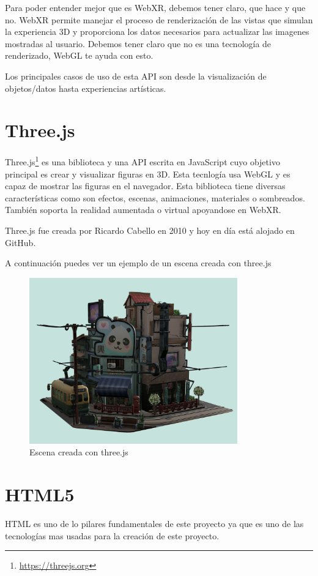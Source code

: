 \documentclass[a4paper, 12pt]{book}
\begin{document}
Para poder entender mejor que es WebXR, debemos tener claro, que hace y que no. WebXR permite manejar el proceso de renderización de las vistas que simulan la experiencia 3D y proporciona los datos necesarios para actualizar las imagenes mostradas al usuario. Debemos tener claro que no es una tecnología de renderizado, WebGL te ayuda con esto.

Los principales casos de uso de esta API son desde la visualización de objetos/datos hasta experiencias artísticas. 

\section{Three.js} %
\label{sec:Three}
Three.js\footnote{\url{https://threejs.org}} es una biblioteca y una API escrita en JavaScript cuyo objetivo principal es crear y visualizar figuras en 3D. Esta tecnlogía usa WebGL y es capaz de mostrar las figuras en el navegador. Esta biblioteca tiene diversas características como son efectos, escenas, animaciones, materiales o sombreados. También soporta la realidad aumentada o virtual apoyandose en WebXR.

Three.js fue creada por Ricardo Cabello en 2010 y hoy en día está alojado en GitHub.

A continuación puedes ver un ejemplo de un escena creada con three.js
\begin{figure}
  \centering
  \includegraphics[width=9cm, keepaspectratio]{img/threejs.png}
  \caption{Escena creada con three.js}\label{fig:three}
\end{figure}


\section{HTML5} %
\label{sec:HTML5}
HTML es uno de lo pilares fundamentales de este proyecto ya que es uno de las tecnologías mas usadas para la creación de este proyecto.
\end{document}
